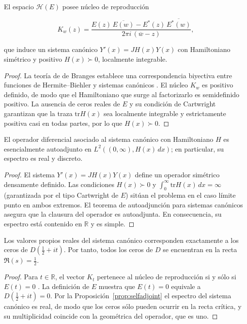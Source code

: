 \begin{lemma}\label{lem:H-positive}
El espacio $\mathcal{H}(E)$ posee núcleo de reproducción

\[
  K_w(z)=\frac{E(z)\,\overline{E(w)}-E^*(z)\,\overline{E^*(w)}}{2\pi i\,(\overline{w}-z)},
\]

que induce un sistema canónico $Y'(x)=JH(x)Y(x)$ con Hamiltoniano simétrico y
positivo $H(x)\succ 0$, localmente integrable.
\end{lemma}

\begin{proof}
La teoría de de Branges establece una correspondencia biyectiva entre funciones
de Hermite--Biehler y sistemas canónicos
\cite[Thm.~16]{deBranges1986}.  El núcleo $K_w$ es positivo definido, de modo que
el Hamiltoniano que surge al factorizarlo es semidefinido positivo.  La ausencia
de ceros reales de $E$ y su condición de Cartwright garantizan que la traza
$\mathrm{tr} H(x)$ sea localmente integrable y estrictamente positiva casi
en todas partes, por lo que $H(x)\succ 0$.
\end{proof}

\begin{proposition}[Autoadjunción]\label{prop:selfadjoint}
El operador diferencial asociado al sistema canónico con Hamiltoniano $H$ es
esencialmente autoadjunto en $L^2((0,\infty),H(x)\,dx)$; en particular, su
espectro es real y discreto.
\end{proposition}

\begin{proof}
El sistema $Y'(x)=JH(x)Y(x)$ define un operador simétrico densamente definido.
Las condiciones $H(x)\succ 0$ y
$\int_0^{\infty}\mathrm{tr} H(x)\,dx=\infty$ (garantizada por el tipo
Cartwright de $E$) sitúan el problema en el caso límite punto en ambos extremos.
El teorema de autoadjunción para sistemas canónicos
\cite[Thm.~35]{deBranges1986} asegura que la clausura del operador es
autoadjunta.  En consecuencia, su espectro está contenido en $\mathbb{R}$ y es
simple.
\end{proof}

\begin{theorem}\label{thm:zeros-critical-line}
Los valores propios reales del sistema canónico corresponden exactamente a los
ceros de $D\!\left(\tfrac{1}{2}+it\right)$.  Por tanto, todos los ceros de $D$ se
encuentran en la recta $\Re(s)=\tfrac{1}{2}$.
\end{theorem}

\begin{proof}
Para $t\in\mathbb{R}$, el vector $K_t$ pertenece al núcleo de reproducción si y
sólo si $E(t)=0$ \cite[Thm.~22]{deBranges1986}.  La definición de $E$ muestra que
$E(t)=0$ equivale a $D\!\left(\tfrac{1}{2}+it\right)=0$.  Por la
Proposición~\ref{prop:selfadjoint} el espectro del sistema canónico es real, de
modo que los ceros sólo pueden ocurrir en la recta crítica, y su multiplicidad
coincide con la geométrica del operador, que es uno.
\end{proof}

